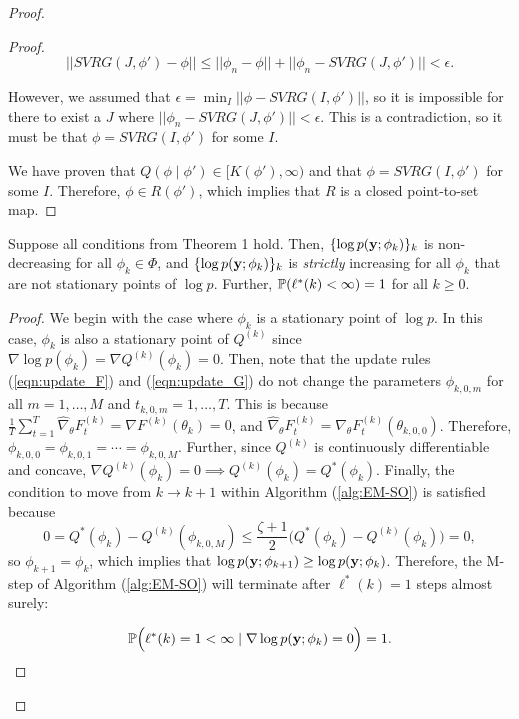 \begin{proof}
\begin{proof}
    $$||SVRG(J,\phi') - \phi|| \leq ||\phi_{n} - \phi|| + ||\phi_{n} - SVRG(J,\phi')|| < \epsilon.$$
    
    However, we assumed that $\epsilon = \min_I ||\phi - SVRG(I,\phi')||$, so it is impossible for there to exist a $J$ where $||\phi_{n} - SVRG(J,\phi')|| < \epsilon$. This is a contradiction, so it must be that $\phi = SVRG(I,\phi')$ for some $I$.
    
    We have proven that $Q(\phi \mid \phi') \in [K(\phi'),\infty)$ and that $\phi = SVRG(I,\phi')$ for some $I$. Therefore, $\phi \in R(\phi')$, which implies that $R$ is a closed point-to-set map.
\end{proof}

\begin{lemma}
    Suppose all conditions from Theorem 1 hold. Then, $\{\log p(\mathbf{y};\phi_k)\}_{k}$ is non-decreasing for all $\phi_k \in \Phi$, and $\{\log p(\mathbf{y};\phi_k)\}_{k}$ is \textit{strictly} increasing for all $\phi_k$ that are not stationary points of $\log p$. Further, $\mathbb{P}(\ell^*(k) < \infty) = 1$ for all $k \geq 0$.
\end{lemma}

\begin{proof}

We begin with the case where $\phi_k$ is a stationary point of $\log p$. In this case, $\phi_k$ is also a stationary point of $Q^{(k)}$ since $\nabla \log p(\phi_k) = \nabla Q^{(k)}(\phi_k) = 0$. Then, note that the update rules (\ref{eqn:update_F}) and (\ref{eqn:update_G}) do not change the parameters $\phi_{k,0,m}$ for all $m = 1,\ldots,M$ and $t_{k,0,m} = 1,\ldots,T$. This is because $\frac{1}{T} \sum_{t=1}^T \widehat \nabla_\theta F^{(k)}_t = \nabla F^{(k)}(\theta_k) = 0$, and $\widehat \nabla_\theta F^{(k)}_t = \nabla_\theta F^{(k)}_t(\theta_{k,0,0})$. Therefore, $\phi_{k,0,0} = \phi_{k,0,1} = \cdots = \phi_{k,0,M}$. Further, since $Q^{(k)}$ is continuously differentiable and concave, $\nabla Q^{(k)}(\phi_k) = 0 \implies Q^{(k)}(\phi_k) = Q^*(\phi_k)$. Finally, the condition to move from $k \to k+1$ within Algorithm (\ref{alg:EM-SO}) is satisfied because 
%
$$0 = Q^*(\phi_k) - Q^{(k)}(\phi_{k,0,M}) \leq \frac{\zeta+1}{2} \Big(Q^*(\phi_k) - Q^{(k)}(\phi_{k})\Big) = 0,$$
%
so $\phi_{k+1} = \phi_{k}$, which implies that $\log p(\mathbf{y};\phi_{k+1}) \geq \log p(\mathbf{y};\phi_k)$. Therefore, the M-step of Algorithm (\ref{alg:EM-SO}) will terminate after $\ell^*(k) = 1$ steps almost surely:

$$\mathbb{P}\Big(\ell^*(k) = 1 < \infty \mid \nabla \log p(\mathbf{y};\phi_k) = 0\Big) = 1.$$


\end{proof}
\end{proof}
